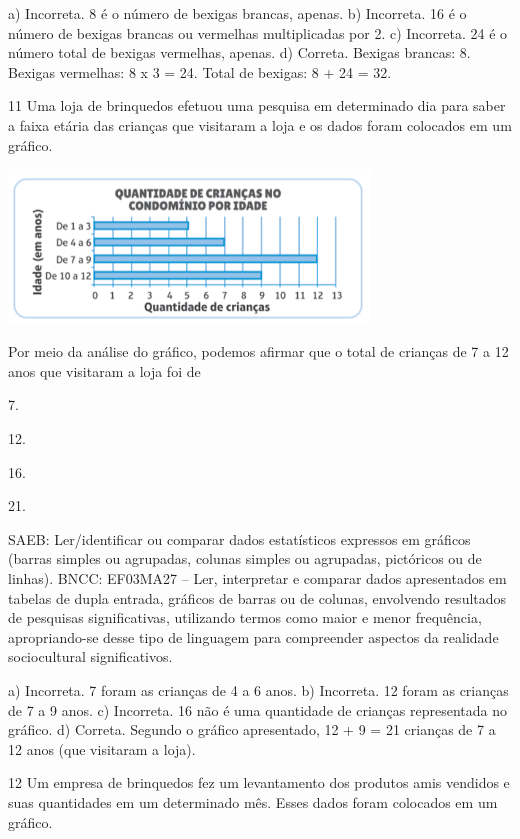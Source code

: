 \begin{multicols}{2}
\begin{enumerate}
{a) Incorreta. 8 é o número de bexigas brancas, apenas.
b) Incorreta. 16 é o número de bexigas brancas ou vermelhas multiplicadas por 2.
c) Incorreta. 24 é o número total de bexigas vermelhas, apenas.
d) Correta. Bexigas brancas: 8. Bexigas vermelhas: 8 x 3 = 24. Total de bexigas: 8 + 24 = 32.

\num{11} Uma loja de brinquedos efetuou uma pesquisa em determinado dia para saber a faixa etária das crianças que visitaram a loja e os dados foram
colocados em um gráfico.


\includegraphics[width=3.77564in,height=1.60972in]{media/image136.png}

Por meio da análise do gráfico, podemos afirmar que o total de crianças de 7 a 12 anos que visitaram a loja foi de

\begin{escolha}

\item
  7.
\item
  12.
\item
  16.
\item
  21.
\end{escolha}

SAEB: Ler/identificar ou comparar dados estatísticos
expressos em gráficos (barras simples ou agrupadas, colunas simples ou agrupadas, pictóricos ou de linhas).
BNCC: EF03MA27 -- Ler, interpretar e comparar dados apresentados em tabelas de dupla entrada,
gráficos de barras ou de colunas, envolvendo resultados de pesquisas significativas, utilizando
termos como maior e menor frequência, apropriando-se desse tipo de linguagem para
compreender aspectos da realidade sociocultural significativos.

a) Incorreta. 7 foram as crianças de 4 a 6 anos.
b) Incorreta. 12 foram as crianças de 7 a 9 anos.
c) Incorreta. 16 não é uma quantidade de crianças representada no gráfico.
d) Correta. Segundo o gráfico apresentado, 12 + 9 = 21 crianças de 7 a 12 anos (que visitaram a loja).

\num{12} Um empresa de brinquedos fez um levantamento dos produtos amis vendidos e suas quantidades em um determinado mês. Esses dados foram colocados em um gráfico.

}
\end{enumerate}
\end{multicols}
